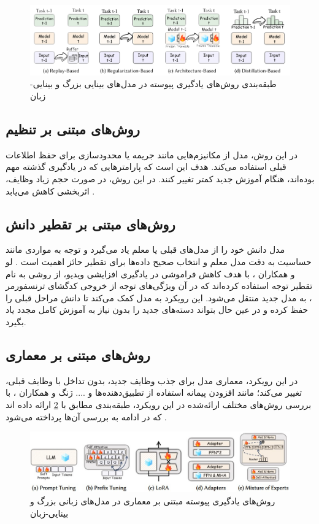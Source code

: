 \begin{figure}
\centering\includegraphics[scale=.45]{Images/Chapter2/llm_methods.png}
\caption[]{طبقه‌بندی روش‌های یادگیری پیوسته در مدل‌های بینایی بزرگ و بینایی-زبان  \protect\cite{llm_continual}}
\label{fig.21}
\end{figure}


\subsection{روش‌های مبتنی بر تنظیم}
در این روش، مدل از مکانیزم‌هایی مانند جریمه یا محدودسازی برای حفظ اطلاعات قبلی استفاده می‌کند. هدف این است که پارامترهایی که در یادگیری گذشته مهم بوده‌اند، هنگام آموزش جدید کمتر تغییر کنند. در این روش، در صورت حجم زیاد وظایف، اثربخشی کاهش می‌یابد
\cite{llm_continual}
.

\subsection{روش‌های مبتنی بر تقطیر دانش}
مدل دانش خود را از مدل‌های قبلی یا معلم یاد می‌گیرد و توجه به مواردی مانند حساسیت به دقت مدل معلم و انتخاب صحیح داده‌ها برای تقطیر حائز اهمیت است
\cite{llm_continual}.
لو و همکاران 
\cite{distillation}،
با هدف کاهش فراموشی در یادگیری افزایشی ویدیو، از روشی به نام تقطیر توجه  استفاده کرده‌اند که در آن ویژگی‌های توجه از خروجی کدگشای ترنسفورمر ، به مدل جدید منتقل می‌شود. این رویکرد به مدل کمک می‌کند تا دانش مراحل قبلی را حفظ کرده و در عین حال بتواند دسته‌های جدید را بدون نیاز به آموزش کامل مجدد یاد بگیرد. 


\subsection{روش‌های مبتنی بر معماری}
در این رویکرد، معماری مدل برای جذب وظایف جدید، بدون تداخل با وظایف قبلی، تغییر می‌کند؛ مانند افزودن پیمانه
 استفاده از تطبیق‌دهنده‌ها و .... 
 ژنگ و همکاران
\cite{llm_continual}،
با بررسی روش‌های مختلف ارائه‌شده در این رویکرد، طبقه‌بندی مطابق با 
\cref{fig.22}
ارائه داده اند که در ادامه به بررسی آن‌ها پرداخته‌ می‌شود
.
\begin{figure}
\centering\includegraphics[scale=.75]{Images/Chapter2/llm_architec_methods.jpg}
\caption[]{ روش‌های یادگیری پیوسته مبتنی بر معماری در مدل‌های زبانی بزرگ و بینایی-زبان \protect\cite{llm_continual}}
\label{fig.22}
\end{figure}

